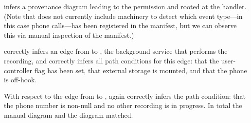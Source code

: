 \hogarth{} infers a provenance diagram leading to the  
permission and rooted at the  handler.
(Note that \hogarth{} does not currently include machinery to detect 
which event type---in this case phone calls---has been registered in the 
manifest, but we can observe this via manual inspection of the manifest.)

\hogarth{} correctly infers an edge from  to 
, the background service that 
performs the recording, and correctly infers all path conditions for 
this edge: that the user-controller flag has been set, that external 
storage is mounted, and that the phone is off-hook. 

With respect to the edge from  
to , \hogarth{} again correctly infers the 
path condition: that the phone number is non-null and no other
recording is in progress. In total the manual diagram and the 
\hogarth{} diagram matched.



%

